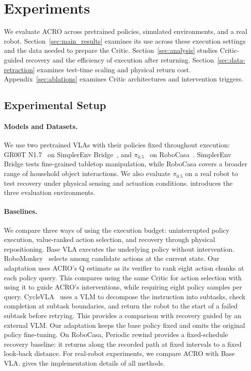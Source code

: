 \section{Experiments}
\label{sec:experiments}
We evaluate ACRO across pretrained policies, simulated environments, and a real robot. Section~\ref{sec:main_results} examines its use across these execution settings and the data needed to prepare the Critic. Section~\ref{sec:analysis} studies Critic-guided recovery and the efficiency of execution after returning. Section~\ref{sec:data-retraction} examines test-time scaling and physical return cost. Appendix~\ref{sec:ablations} examines Critic architectures and intervention triggers.

\subsection{Experimental Setup}
\label{sec:exp_setup}

\paragraph{Models and Datasets.}
We use two pretrained VLAs with their policies fixed throughout execution: GR00T N1.7~\citep{nvidia2026groot17} on SimplerEnv Bridge~\citep{li2025simpler}, and $\pi_{0.5}$~\citep{black2025pi05} on RoboCasa~\citep{nasiriany2024robocasa}. SimplerEnv Bridge tests fine-grained tabletop manipulation, while RoboCasa covers a broader range of household object interactions. We also evaluate $\pi_{0.5}$ on a real robot to test recovery under physical sensing and actuation conditions.  introduces the three evaluation environments.


\paragraph{Baselines.}
We compare three ways of using the execution budget: uninterrupted policy execution, value-ranked action selection, and recovery through physical repositioning. Base VLA executes the underlying policy without intervention. RoboMonkey~\citep{kwok2025robomonkey} selects among candidate actions at the current state. Our adaptation uses ACRO's Q estimate as its verifier to rank eight action chunks at each policy query. This compares using the same Critic for action selection with using it to guide ACRO's interventions, while requiring eight policy samples per query. CycleVLA~\citep{ma2026cyclevla} uses a VLM to decompose the instruction into subtasks, check completion at subtask boundaries, and return the robot to the start of a failed subtask before retrying. This provides a comparison with recovery guided by an external VLM. Our adaptation keeps the base policy fixed and omits the original policy fine-tuning. On RoboCasa, Periodic rewind provides a fixed-schedule recovery baseline: it returns along the recorded path at fixed intervals to a fixed look-back distance. For real-robot experiments, we compare ACRO with Base VLA.  gives the implementation details of all methods.

